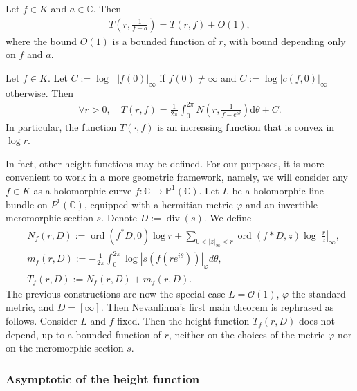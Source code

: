 \documentclass [11pt,reqno]{amsart}
\def\bC{{\mathbb{C}}}
\def\bP{{\mathbb{P}}}
\newcommand{\1}{\mathmybb{1}}
\def\cO{{\mathcal{O}}}
\def\diff{\mathrm{d}}
\def\div{\operatorname{div}}
\def\ord{\operatorname{ord}}
\begin{document}
\begin{theorem}
Let $f\in K$ and $a\in \bC$. Then
\begin{align*}
T(r,\frac{1}{f-a}) = T(r,f) + O(1),
\end{align*}
where the bound $O(1)$ is a bounded function of $r$, with bound depending only on $f$ and $a$.
\end{theorem}

\begin{proposition}
\label{prop:Cartan_formula}
Let $f\in K$. Let $C:=\log^{+}|f(0)|_{\infty}$ if $f(0)\neq \infty$ and $C:=\log|c(f,0)|_{\infty}$ otherwise. Then 
\begin{align*}
\forall r>0, \quad T(r,f) = \frac{1}{2\pi}\int_{0}^{2\pi}N\left(r, \frac{1}{f-e^{i\theta}}\right)\diff\theta + C.
\end{align*}
In particular, the function $T(\cdot,f)$ is an increasing function that is convex in $\log r$.
\end{proposition}

In fact, other height functions may be defined. For our purposes, it is more convenient to work in a more geometric framework, namely, we will consider any $f\in K$ as a holomorphic curve $f:\bC \to \bP^{1}(\bC)$. Let $L$ be a holomorphic line bundle on $P^1(\bC)$, equipped with a hermitian metric $\varphi$ and an invertible meromorphic section $s$. Denote $D:=\div(s)$. We define
\begin{align*}
&N_f(r,D) := \ord(f^\ast D,0)\log r + \displaystyle\sum_{0<|z|_{\infty}<r} \ord(f\ast D,z)\log \left|\frac{r}{z}\right|_{\infty},\\
&m_f(r,D) := -\frac{1}{2\pi} \int_0^{2\pi} \log |s(f(re^{i\theta}))|_{\varphi} d\theta,\\
&T_f(r,D) := N_f(r,D) + m_f(r,D).
\end{align*} 
The previous constructions are now the special case $L=\cO(1)$, $\varphi$ the standard metric, and $D=[\infty]$. Then Nevanlinna's first main theorem is rephrased as follows. Consider $L$ and $f$ fixed. Then the height function $T_f(r,D)$ does not depend, up to a bounded function of $r$, neither on the choices of the metric $\varphi$ nor on the meromorphic section $s$.

\subsubsection{Asymptotic of the height function}
\label{subsub:asymptotic_height_Nevanlinna}
\end{document}

